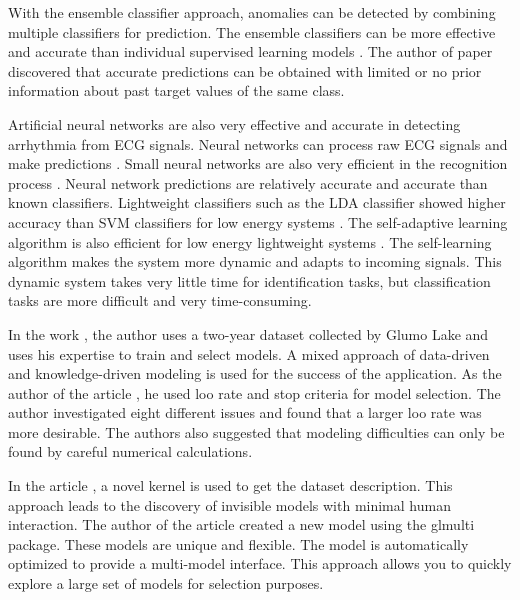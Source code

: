 With the ensemble classifier approach, anomalies can be detected by combining multiple classifiers for prediction. The ensemble classifiers can be more effective and accurate than individual supervised learning models \cite{sun2020multi, liu2020parallel, huang2020accurate}. The author of paper \cite{rajak2020applying} discovered that accurate predictions can be obtained with limited or no prior information about past target values of the same class.

Artificial neural networks are also very effective and accurate in detecting arrhythmia from ECG signals. Neural networks can process raw ECG signals and make predictions \cite{hannun2019cardiologist}. Small neural networks are also very efficient in the recognition process \cite{sannino2018deep}. Neural network predictions are relatively accurate and accurate than known classifiers. Lightweight classifiers such as the LDA classifier showed higher accuracy than SVM classifiers for low energy systems \cite{chen2013design}. The self-adaptive learning algorithm is also efficient for low energy lightweight systems \cite{lei2007afc, owis2002study}. The self-learning algorithm makes the system more dynamic and adapts to incoming signals. This dynamic system takes very little time for identification tasks, but classification tasks are more difficult and very time-consuming.

In the work \cite{natasa2008}, the author uses a two-year dataset collected by Glumo Lake and uses his expertise to train and select models. A mixed approach of data-driven and knowledge-driven modeling is used for the success of the application. As the author of the article \cite{lee2000automatic}, he used loo rate and stop criteria for model selection. The author investigated eight different issues and found that a larger loo rate was more desirable. The authors also suggested that modeling difficulties can only be found by careful numerical calculations.

In the article \cite{malkomes2016bayesian}, a novel kernel is used to get the dataset description. This approach leads to the discovery of invisible models with minimal human interaction. The author of the article \cite{JSSv034i12} created a new model using the glmulti package. These models are unique and flexible. The model is automatically optimized to provide a multi-model interface. This approach allows you to quickly explore a large set of models for selection purposes.